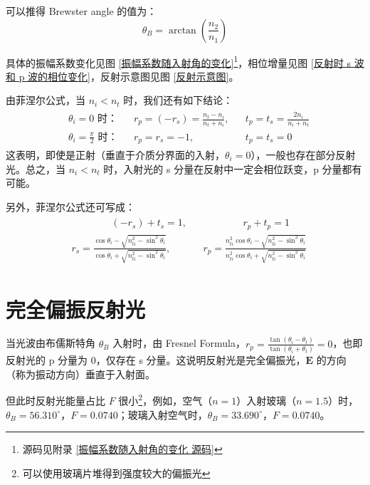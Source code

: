\documentclass[UTF8]{report}
\theoremstyle{MyLineTheoremStyle} %
\theoremstyle{MyBlockTheoremStyle} %
\theoremstyle{MySubsubsectionStyle} %
\begin{document}
可以推得 Brewster angle 的值为：
\begin{equation}
    \theta_B = \arctan \left( \frac{n_2}{n_1} \right)
\end{equation}


具体的振幅系数变化见图 \ref{振幅系数随入射角的变化}\footnote{源码见附录 \ref{振幅系数随入射角的变化 源码}}，相位增量见图 \ref{反射时 s 波和 p 波的相位变化}，反射示意图见图 \ref{反射示意图}。


由菲涅尔公式，当 $n_i < n_t$ 时，我们还有如下结论：
\begin{gather}
    \begin{aligned}
        &\text{$\theta_i = 0$ 时：} &&r_p = (-r_s)  = \frac{n_t - n_i}{n_t + n_i}, &&t_p = t_s = \frac{2n_i}{n_i + n_t} \\ 
        &\text{$\theta_i = \frac{\pi}{2}$ 时：} &&r_p = r_s  = -1,&&t_p = t_s  =0
    \end{aligned}
\end{gather}
这表明，即使是正射（垂直于介质分界面的入射，$\theta_i = 0$），一般也存在部分反射光。总之，当 $n_i < n_t$ 时，入射光的 s 分量在反射中一定会相位跃变，p 分量都有可能。

另外，菲涅尔公式还可写成：
\begin{gather}
\boxed{
\begin{aligned}
    &\quad\quad \quad \quad   (-r_s) + t_s  = 1, &&\quad 
    \quad \quad\quad   r_p + t_p = 1 
    \\ 
    &r_s = \frac{\cos \theta_i - \sqrt{n_{ti}^2 - \sin^2 \theta_i} }{\cos \theta_i + \sqrt{n_{ti}^2 - \sin^2 \theta_i}}, && r_p = \frac{n_{ti}^2\cos \theta_i - \sqrt{n_{ti}^2 - \sin^2 \theta_i} }{n_{ti}^2\cos \theta_i + \sqrt{n_{ti}^2 - \sin^2 \theta_i}}
\end{aligned}
}
\end{gather}

\section{完全偏振反射光}

当光波由布儒斯特角 $\theta_B$ 入射时，由 Fresnel Formula，$r_p = \frac{\tan (\theta_i - \theta_t)}{\tan (\theta_i + \theta_t)} = 0$，也即反射光的 p 分量为 0，仅存在 s 分量。这说明反射光是完全偏振光，$\boldsymbol{E}$ 的方向（称为振动方向）垂直于入射面。
{\par\color{gray}\small
但此时反射光能量占比 $F$ 很小\footnote{可以使用玻璃片堆得到强度较大的偏振光}，例如，空气（$n=1$）入射玻璃（$n = 1.5$）时，$\theta_B = 56.310^\circ$，$F =0.0740 $；玻璃入射空气时，$\theta_B = 33.690^\circ$，$F =0.0740 $。
\par}
\end{document}
